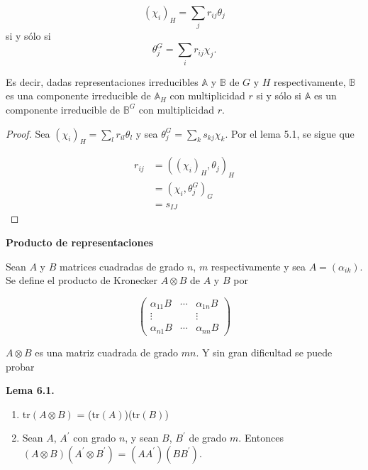\documentclass[12pt]{book}
\theoremstyle{definition}
\newcounter{in}
\begin{document}
\begin{equation*}
  (\chi_{i})_{H} = \sum_{j} r_{ij} \theta_{j} 
\end{equation*}
si y sólo si 
\begin{equation*}
  \theta_{j}^{G} = \sum_{i} r_{ij} \chi_{j}.
\end{equation*}

Es decir, dadas representaciones irreducibles $\mathbb{A}$ y
$\mathbb{B}$ de $G$ y $H$ respectivamente, $\mathbb{B}$ es una
componente irreducible de $\mathbb{A}_{H}$ con multiplicidad $r$ si y
sólo si $\mathbb{A}$ es un componente irreducible de $\mathbb{B}^{G}$
con multiplicidad $r$.

\begin{proof}
  Sea $(\chi_{i})_{H} = \sum_{l} r_{il} \theta_{l}$ y sea
  $\theta_{j}^{G} = \sum_{k} s_{kj} \chi_{k}$. Por el lema 5.1, se
  sigue que

  \begin{equation*}
    \begin{aligned}
      r_{ij} &= ((\chi_{i})_{H},\theta_{j})_{H} \\
      &= (\chi_{i},\theta_{j}^{G})_{G}\\
      &= s_{IJ}
    \end{aligned}
  \end{equation*}
\end{proof}


\textbf{Producto de representaciones}

Sean $A$ y $B$ matrices cuadradas de grado $n$, $m$ respectivamente y
sea $A=(\alpha_{ik})$. Se define el producto de Kronecker
$A \otimes B$ de $A$ y $B$ por

\begin{equation*}
  \begin{pmatrix}
    \alpha_{11}B & \cdots & \alpha_{1n}B \\ 
    \vdots &  & \vdots \\
    \alpha_{n1}B & \cdots & \alpha_{nn}B
  \end{pmatrix}
\end{equation*}

$A \otimes B$ es una matriz cuadrada de grado $mn$. Y sin gran
dificultad se puede probar

\textbf{Lema 6.1. }
\begin{enumerate}
\item  tr$(A \otimes B)$ = (tr$(A)$)(tr$(B)$)
\item Sean $A$, $A^{'}$ con grado $n$, y sean $B$, $B^{'}$ de grado
  $m$. Entonces $(A \otimes B)(A^{'} \otimes B^{'})$ =
  $(AA^{'})(BB^{'})$.
\end{enumerate}
\end{document}
